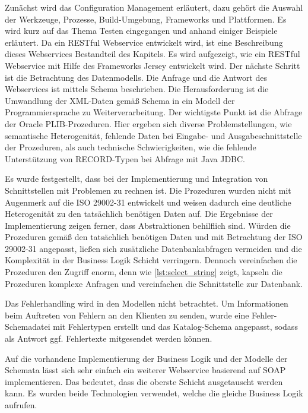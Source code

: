 Zunächst wird das Configuration Management erläutert, dazu gehört die Auswahl der Werkzeuge, Prozesse, Build-Umgebung, Frameworks und Plattformen. Es wird kurz auf das Thema Testen eingegangen und anhand einiger Beispiele erläutert. Da ein \gls{REST}ful \gls{Webservice} entwickelt wird, ist eine Beschreibung dieses Webservices Bestandteil des Kapitels. Es wird aufgezeigt, wie ein  \gls{REST}ful \gls{Webservice} mit Hilfe des Frameworks Jersey entwickelt wird. 
Der nächste Schritt ist die Betrachtung des Datenmodells. Die Anfrage und die Antwort des  \glspl{Webservice} ist mittels Schema beschrieben. Die Herausforderung ist die Umwandlung der XML-Daten gemäß Schema in ein Modell der Programmiersprache zu Weiterverarbeitung.  
Der wichtigste Punkt ist die Abfrage der \gls{Oracle} \gls{PLIB}-Prozeduren. Hier ergeben sich diverse Problemstellungen, wie semantische Heterogenität, fehlende Daten bei Eingabe- und Ausgabeschnittstelle der Prozeduren, als auch technische Schwierigkeiten, wie die fehlende Unterstützung von RECORD-Typen bei Abfrage mit Java JDBC.

Es wurde festgestellt, dass bei der Implementierung und Integration von Schnittstellen mit Problemen zu rechnen ist. Die Prozeduren wurden nicht mit Augenmerk auf die ISO 29002-31 entwickelt und weisen dadurch eine deutliche Heterogenität zu den tatsächlich benötigen Daten auf. Die Ergebnisse der Implementierung zeigen ferner, dass Abstraktionen behilflich sind. Würden die Prozeduren gemäß den tatsächlich benötigen Daten und mit Betrachtung der ISO 29002-31 angepasst, ließen sich zusätzliche Datenbankabfragen vermeiden und die Komplexität in der Business Logik Schicht verringern. Dennoch vereinfachen die Prozeduren den Zugriff enorm, denn wie \autoref{lst:select_string} zeigt, kapseln die Prozeduren komplexe Anfragen und vereinfachen die Schnittstelle zur Datenbank. 
 
Das Fehlerhandling wird in den Modellen nicht betrachtet. Um Informationen beim Auftreten von Fehlern an den Klienten zu senden, wurde eine Fehler-Schemadatei mit Fehlertypen erstellt und das Katalog-Schema angepasst, sodass als Antwort ggf. Fehlertexte mitgesendet werden können. 

Auf die vorhandene Implementierung der Business Logik und der Modelle der Schemata lässt sich sehr einfach ein weiterer \gls{Webservice} basierend auf SOAP implementieren. Das bedeutet, dass die oberste Schicht ausgetauscht werden kann. Es wurden beide Technologien verwendet, welche die gleiche Business Logik aufrufen. 


